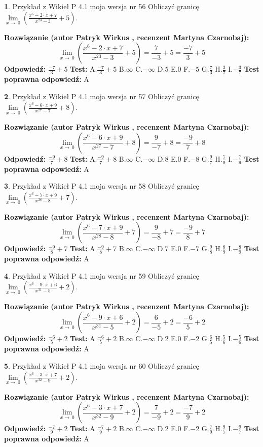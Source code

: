 \documentclass[12pt, a4paper]{article}
\theoremstyle{definition} %
\newtheorem{zad}{}
\newcommand{\zadStart}[1]{\begin{zad}#1\newline}
\newcommand{\zadStop}{\end{zad}}
\newcommand{\rozwStart}[2]{\noindent \textbf{Rozwiązanie (autor #1 , recenzent #2): }\newline}
\newcommand{\rozwStop}{\newline}
\newcommand{\odpStart}{\noindent \textbf{Odpowiedź:}\newline}
\newcommand{\odpStop}{\newline}
\newcommand{\testStart}{\noindent \textbf{Test:}\newline}
\newcommand{\testStop}{\newline}
\newcommand{\kluczStart}{\noindent \textbf{Test poprawna odpowiedź:}\newline}
\newcommand{\kluczStop}{\newline}
\begin{document}
\zadStart{Przykład z Wikieł P 4.1 moja wersja nr 56}
Obliczyć granicę $\lim\limits_{x\to\ 0}(\frac{x^{6}-2 \cdot x +7}{x^{23}-3}+5)$.
\zadStop
\rozwStart{Patryk Wirkus}{Martyna Czarnobaj}
$$\lim\limits_{x\to\ 0}(\frac{x^{6}-2 \cdot x +7}{x^{23}-3}+5)=\frac{7}{-3}+5=\frac{-7}{3}+5$$
\rozwStop
\odpStart
$\frac{-7}{3}+5$
\odpStop
\testStart
A.$\frac{-7}{3}+5$
B.$\infty$
C.$-\infty$
D.$5$
E.$0$
F.$-5$
G.$\frac{7}{3}$
H.$\frac{3}{7}$
I.$-\frac{3}{7}$
\testStop
\kluczStart
A
\kluczStop



\zadStart{Przykład z Wikieł P 4.1 moja wersja nr 57}
Obliczyć granicę $\lim\limits_{x\to\ 0}(\frac{x^{6}-6 \cdot x +9}{x^{27}-7}+8)$.
\zadStop
\rozwStart{Patryk Wirkus}{Martyna Czarnobaj}
$$\lim\limits_{x\to\ 0}(\frac{x^{6}-6 \cdot x +9}{x^{27}-7}+8)=\frac{9}{-7}+8=\frac{-9}{7}+8$$
\rozwStop
\odpStart
$\frac{-9}{7}+8$
\odpStop
\testStart
A.$\frac{-9}{7}+8$
B.$\infty$
C.$-\infty$
D.$8$
E.$0$
F.$-8$
G.$\frac{9}{7}$
H.$\frac{7}{9}$
I.$-\frac{7}{9}$
\testStop
\kluczStart
A
\kluczStop



\zadStart{Przykład z Wikieł P 4.1 moja wersja nr 58}
Obliczyć granicę $\lim\limits_{x\to\ 0}(\frac{x^{6}-7 \cdot x +9}{x^{28}-8}+7)$.
\zadStop
\rozwStart{Patryk Wirkus}{Martyna Czarnobaj}
$$\lim\limits_{x\to\ 0}(\frac{x^{6}-7 \cdot x +9}{x^{28}-8}+7)=\frac{9}{-8}+7=\frac{-9}{8}+7$$
\rozwStop
\odpStart
$\frac{-9}{8}+7$
\odpStop
\testStart
A.$\frac{-9}{8}+7$
B.$\infty$
C.$-\infty$
D.$7$
E.$0$
F.$-7$
G.$\frac{9}{8}$
H.$\frac{8}{9}$
I.$-\frac{8}{9}$
\testStop
\kluczStart
A
\kluczStop



\zadStart{Przykład z Wikieł P 4.1 moja wersja nr 59}
Obliczyć granicę $\lim\limits_{x\to\ 0}(\frac{x^{6}-9 \cdot x +6}{x^{31}-5}+2)$.
\zadStop
\rozwStart{Patryk Wirkus}{Martyna Czarnobaj}
$$\lim\limits_{x\to\ 0}(\frac{x^{6}-9 \cdot x +6}{x^{31}-5}+2)=\frac{6}{-5}+2=\frac{-6}{5}+2$$
\rozwStop
\odpStart
$\frac{-6}{5}+2$
\odpStop
\testStart
A.$\frac{-6}{5}+2$
B.$\infty$
C.$-\infty$
D.$2$
E.$0$
F.$-2$
G.$\frac{6}{5}$
H.$\frac{5}{6}$
I.$-\frac{5}{6}$
\testStop
\kluczStart
A
\kluczStop



\zadStart{Przykład z Wikieł P 4.1 moja wersja nr 60}
Obliczyć granicę $\lim\limits_{x\to\ 0}(\frac{x^{6}-3 \cdot x +7}{x^{32}-9}+2)$.
\zadStop
\rozwStart{Patryk Wirkus}{Martyna Czarnobaj}
$$\lim\limits_{x\to\ 0}(\frac{x^{6}-3 \cdot x +7}{x^{32}-9}+2)=\frac{7}{-9}+2=\frac{-7}{9}+2$$
\rozwStop
\odpStart
$\frac{-7}{9}+2$
\odpStop
\testStart
A.$\frac{-7}{9}+2$
B.$\infty$
C.$-\infty$
D.$2$
E.$0$
F.$-2$
G.$\frac{7}{9}$
H.$\frac{9}{7}$
I.$-\frac{9}{7}$
\testStop
\kluczStart
A
\kluczStop
\end{document}
